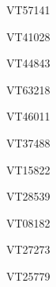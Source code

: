 \documentclass[17pt]{extarticle}
\begin{document}
\footnotesize
\newpage\vspace*{-0.15cm}
\begin{large}
VT57141 \\[0.5em]
\end{large}
\footnotesize
\newpage\vspace*{-0.15cm}
\begin{large}
VT41028 \\[0.5em]
\end{large}
\footnotesize
\newpage\vspace*{-0.15cm}
\begin{large}
VT44843 \\[0.5em]
\end{large}
\footnotesize
\newpage\vspace*{-0.15cm}
\begin{large}
VT63218 \\[0.5em]
\end{large}
\footnotesize
\newpage\vspace*{-0.15cm}
\begin{large}
VT46011 \\[0.5em]
\end{large}
\footnotesize
\newpage\vspace*{-0.15cm}
\begin{large}
VT37488 \\[0.5em]
\end{large}
\footnotesize
\newpage\vspace*{-0.15cm}
\begin{large}
VT15822 \\[0.5em]
\end{large}
\footnotesize
\newpage\vspace*{-0.15cm}
\begin{large}
VT28539 \\[0.5em]
\end{large}
\footnotesize
\newpage\vspace*{-0.15cm}
\begin{large}
VT08182 \\[0.5em]
\end{large}
\footnotesize
\newpage\vspace*{-0.15cm}
\begin{large}
VT27273 \\[0.5em]
\end{large}
\footnotesize
\newpage\vspace*{-0.15cm}
\begin{large}
VT25779 \\[0.5em]
\end{large}
\end{document}
